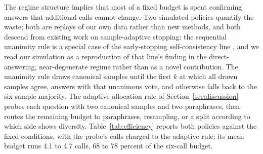 The regime structure implies that most of a fixed budget is spent confirming answers that additional calls cannot change. Two simulated policies quantify the waste; both are replays of our own data rather than new methods, and both descend from existing work on sample-adaptive stopping: the sequential unanimity rule is a special case of the early-stopping self-consistency line \citep{aggarwal2023lets,li2024escape}, and we read our simulation as a reproduction of that line's finding in the direct-answering, near-degenerate regime rather than as a novel contribution. The unanimity rule draws canonical samples until the first $k$ at which all drawn samples agree, answers with that unanimous vote, and otherwise falls back to the six-sample majority. The adaptive allocation rule of Section~\ref{sec:discussion} probes each question with two canonical samples and two paraphrases, then routes the remaining budget to paraphrases, resampling, or a split according to which side shows diversity. Table~\ref{tab:efficiency} reports both policies against the fixed conditions, with the probe's calls charged to the adaptive rule; its mean budget runs 4.1 to 4.7 calls, 68 to 78 percent of the six-call budget.

\begin{table}[htbp]
\centering
\footnotesize
\caption{Budget efficiency on the development suite. Accuracy (\%) of the fixed conditions against the sequential unanimity rule (ES, with mean budget $\bar{k}$) and the adaptive allocation rule (Ada, with mean budget and its share of the six-call budget), both simulated on the collected call matrices.}
\label{tab:efficiency}

\end{table}

